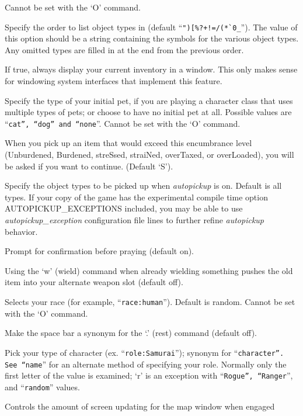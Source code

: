 Cannot be set with the `O' command.
\item[\tb{packorder}]
Specify the order to list object types in (default
``\verb&")[%?+!=/(*`0_&''). The value of this option should be a string
containing the symbols for the various object types.  Any omitted types
are filled in at the end from the previous order.
\item[\tb{perm\_invent}]
If true, always display your current inventory in a window.  This only
makes sense for windowing system interfaces that implement this feature.
\item[\tb{pettype}]
Specify the type of your initial pet, if you are playing a character class
that uses multiple types of pets; or choose to have no initial pet at all.
Possible values are ``{\tt cat'', ``dog'' and ``none}''.
Cannot be set with the `O' command.
\item[\tb{pickup\_burden}]
When you pick up an item that would exceed this encumbrance
level (Unburdened, Burdened, streSsed, straiNed, overTaxed,
or overLoaded), you will be asked if you want to continue.
(Default `S').
\item[\tb{pickup\_types}]
Specify the object types to be picked up when
{\it autopickup }
is on.  Default is all types.  If your copy of the game has the experimental
compile time option AUTOPICKUP\_EXCEPTIONS included, you may be able to use 
{\it autopickup\_exception }
configuration file lines to further refine
{\it autopickup }
behavior.
\item[\tb{prayconfirm}]
Prompt for confirmation before praying (default on).
\item[\tb{pushweapon}]
Using the `w' (wield) command when already wielding
something pushes the old item into your alternate weapon slot (default off).
\item[\tb{race}]
Selects your race (for example, ``{\tt race:human}'').  Default is random.
Cannot be set with the `O' command.
\item[\tb{rest\_on\_space}]
Make the space bar a synonym for the `.' (rest) command (default off).
\item[\tb{"role    "}]
Pick your type of character (ex. ``{\tt role:Samurai}'');
synonym for ``{\tt character''.  See ``name}'' for an alternate method
of specifying your role.  Normally only the first letter of the
value is examined; `r' is an exception with ``{\tt Rogue'', ``Ranger}'',
and ``{\tt random}'' values.
\item[\tb{runmode}]
Controls the amount of screen updating for the map window when engaged
